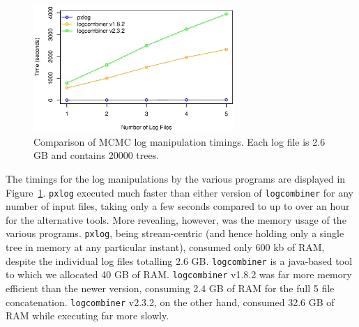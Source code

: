 \documentclass{article}
\begin{document}
\begin{figure}[!h]
    \centering
    \includegraphics[width=3.0in]{log}
    \caption{Comparison of MCMC log manipulation timings. Each log file
    is 2.6 GB and contains 20000 trees.}
    \label{logfigure}
\label{fig:S3}
\end{figure}

The timings for the log manipulations by the various programs are displayed in Figure~\ref{fig:S3}. \texttt{pxlog} executed much faster than either version of \texttt{logcombiner} for any number of input files, taking only a few seconds compared to up to over an hour for the alternative tools. More revealing, however, was the memory usage of the various programs. \texttt{pxlog}, being stream-centric (and hence holding only a single tree in memory at any particular instant), consumed only 600 kb of RAM, despite the individual log files totalling 2.6 GB. \texttt{logcombiner} is a java-based tool to which we allocated 40 GB of RAM. \texttt{logcombiner} v1.8.2 was far more memory efficient than the newer version, consuming 2.4 GB of RAM for the full 5 file concatenation. \texttt{logcombiner} v2.3.2, on the other hand, consumed 32.6 GB of RAM while executing far more slowly.

%
%
%
%
%
%
%

\end{document}
